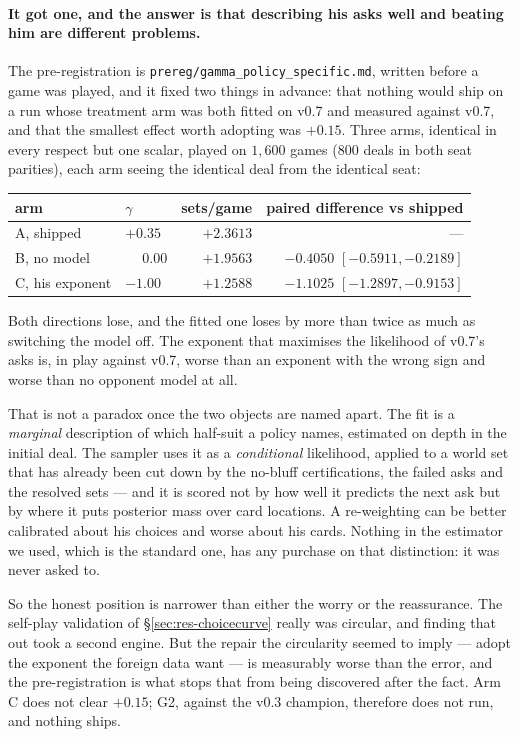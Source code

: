 \documentclass[11pt,a4paper]{article}
\begin{document}
\paragraph{It got one, and the answer is that describing his asks well and
beating him are different problems.} The pre-registration is
\texttt{prereg/gamma\_policy\_specific.md}, written before a game was played,
and it fixed two things in advance: that nothing would ship on a run whose
treatment arm was both fitted on v0.7 and measured against v0.7, and that the
smallest effect worth adopting was $+0.15$. Three arms, identical in every
respect but one scalar, played on $1{,}600$ games ($800$ deals in both seat
parities), each arm seeing the identical deal from the identical seat:

\begin{center}
\small
\begin{tabular}{llrr}
\toprule
arm & $\gamma$ & sets/game & paired difference vs shipped \\
\midrule
A, shipped        & $+0.35$ & $+2.3613$ & --- \\
B, no model       & $\phantom{+}0.00$ & $+1.9563$ & $-0.4050$ $[-0.5911, -0.2189]$ \\
C, his exponent   & $-1.00$ & $+1.2588$ & $-1.1025$ $[-1.2897, -0.9153]$ \\
\bottomrule
\end{tabular}
\end{center}

\noindent Both directions lose, and the fitted one loses by more than twice as
much as switching the model off. The exponent that maximises the likelihood of
v0.7's asks is, in play against v0.7, worse than an exponent with the wrong
sign and worse than no opponent model at all.

That is not a paradox once the two objects are named apart. The fit is a
\emph{marginal} description of which half-suit a policy names, estimated on
depth in the initial deal. The sampler uses it as a \emph{conditional}
likelihood, applied to a world set that has already been cut down by the
no-bluff certifications, the failed asks and the resolved sets --- and it is
scored not by how well it predicts the next ask but by where it puts posterior
mass over card locations. A re-weighting can be better calibrated about his
choices and worse about his cards. Nothing in the estimator we used, which is
the standard one, has any purchase on that distinction: it was never asked to.

So the honest position is narrower than either the worry or the reassurance.
The self-play validation of \S\ref{sec:res-choicecurve} really was circular,
and finding that out took a second engine. But the repair the circularity
seemed to imply --- adopt the exponent the foreign data want --- is measurably
worse than the error, and the pre-registration is what stops that from being
discovered after the fact. Arm C does not clear $+0.15$; G2, against the v0.3
champion, therefore does not run, and nothing ships.
\end{document}
